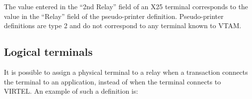 \documentclass[letterpaper,10pt,english]{sphinxmanual}
\begin{document}
The value entered in the “2nd Relay” field of an X25 terminal corresponds to the value in the “Relay” field of the pseudo-printer definition. Pseudo-printer definitions are type 2 and do not correspond to any terminal known to VTAM.


\subsection{Logical terminals}
\label{\detokenize{connectivity_guide:logical-terminals}}\label{\detokenize{connectivity_guide:index-148}}
It is possible to assign a physical terminal to a relay when a transaction connects the terminal to an application, instead of when the terminal connects to VIRTEL. An example of such a definition is:

\begin{sphinxVerbatim}[commandchars=\\\{\}]
  

                 

                          
\end{sphinxVerbatim}

\begin{sphinxVerbatim}[commandchars=\\\{\}]
      

                 

                          
                          
                          
\end{sphinxVerbatim}
\end{document}
